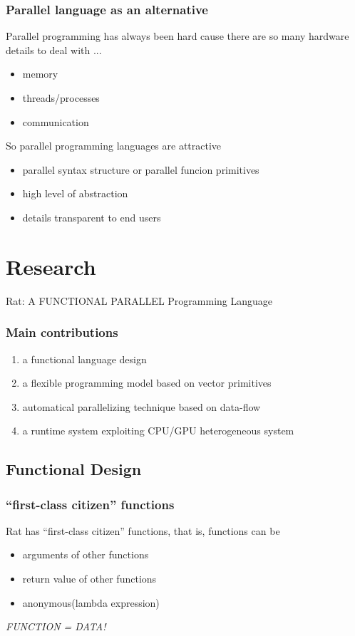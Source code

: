 \documentclass{beamer}
\begin{document}
\begin{frame}
  \frametitle{Parallel language as an alternative}
  Parallel programming has always been hard cause there are so many hardware details to deal with ...
  \begin{itemize}
    \item memory
    \item threads/processes
    \item communication
  \end{itemize}

  So parallel programming languages are attractive
  \begin{itemize}
    \item parallel syntax structure or parallel funcion primitives
    \item high level of abstraction
    \item details transparent to end users
  \end{itemize}
\end{frame}

\section{Research}
\begin{frame}                   %
  Rat: A {\Large FUNCTIONAL PARALLEL} Programming Language
\end{frame}

\begin{frame}
  \frametitle{Main contributions}
  \begin{enumerate}
    \item a functional language design
    \item a flexible programming model based on vector primitives
    \item automatical parallelizing technique based on data-flow
    \item a runtime system exploiting CPU/GPU heterogeneous system
  \end{enumerate}
\end{frame}

\subsection{Functional Design}

\begin{frame}
  \frametitle{``first-class citizen'' functions}
  Rat has ``first-class citizen'' functions, that is, functions can be
  \begin{itemize}
    \item arguments of other functions
    \item return value of other functions
    \item anonymous(lambda expression)
  \end{itemize}

  \emph{FUNCTION = DATA!}             %
\end{frame}
\end{document}
